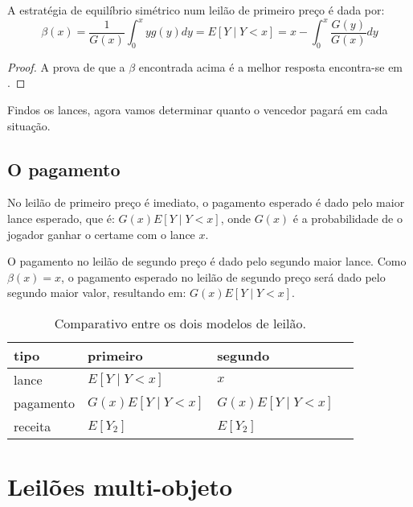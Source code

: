 \begin{lema}
    A estratégia de equilíbrio simétrico num leilão de primeiro preço é dada por:
    \begin{equation}
        \beta(x) = \frac{1}{G(x)} \int_{0}^{x} yg(y)dy = E\left[ Y \mid Y<x \right] = x - \int_{0}^{x} \frac{G(y)}{G(x)}dy
    \end{equation}
\end{lema}
\begin{proof}
	A prova de que a $\beta$ encontrada acima é a melhor resposta encontra-se em \citet{krishna}.
\end{proof}

Findos os lances, agora vamos determinar quanto o vencedor pagará em cada situação.

\subsection{O pagamento}

No leilão de primeiro preço é imediato, o pagamento esperado é dado pelo maior lance esperado, que é: $G(x)E\left[ Y \mid Y<x \right]$, onde $G(x)$ é a probabilidade de o jogador ganhar o certame com o lance $x$.

O pagamento no leilão de segundo preço é dado pelo segundo maior lance. Como $\beta(x) = x$, o pagamento esperado no leilão de segundo preço será dado pelo segundo maior valor, resultando em: $G(x)E\left[ Y \mid Y<x \right]$.

\begin{table}[]
	\centering
	\begin{tabular}{@{}llll@{}}
		\toprule
		tipo      & primeiro 					     & segundo      					\\ \midrule
		lance     & $E\left[ Y \mid Y<x \right]$     & $x$             					\\
		pagamento & $G(x)E\left[ Y \mid Y<x \right]$ & $G(x)E\left[ Y \mid Y<x \right]$ \\
		receita   & $E\left[ Y_2 \right]$            & $E\left[ Y_2 \right]$            \\
	\end{tabular}
	\caption{Comparativo entre os dois modelos de leilão.}
	\label{tab:tabela1}
\end{table}

\section{Leilões multi-objeto}

